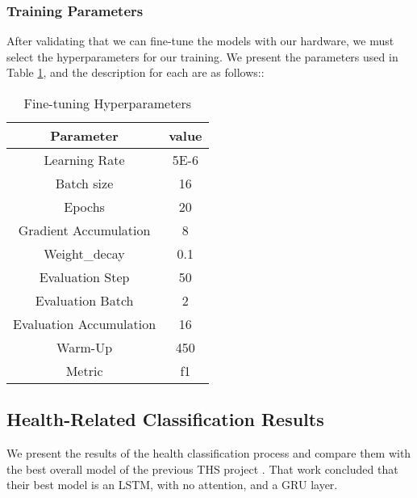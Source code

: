 \subsubsection{Training Parameters}
After validating that we can fine-tune the models with our hardware, we must select the hyperparameters for our training. We present the parameters used in Table \ref{table:hyperparameters}, and the description for each are as follows::

\begin{table}[!ht]
	\centering
	\caption{Fine-tuning Hyperparameters}
	{\small
	\begin{tabular}{||c | c||} 
		\hline
		\textbf{Parameter} & \textbf{value} \\ 
		\hline
		Learning Rate & 5E-6  \\
		\hline
		Batch size & 16  \\
		\hline
		Epochs & 20 \\
		\hline
		Gradient Accumulation & 8 \\
		\hline
		Weight\_decay & 0.1 \\
		\hline
		Evaluation Step & 50 \\
		\hline
		Evaluation Batch & 2 \\
		\hline
		Evaluation Accumulation & 16 \\
		\hline
		Warm-Up & 450 \\
		\hline
		Metric & f1 \\
		\hline
	\end{tabular}
	}
	\label{table:hyperparameters}
\end{table}



\subsection{Health-Related Classification Results}
We present the results of the health classification process and compare them with the best overall model of the previous THS project \cite{8622504}. That work concluded
that their best model is an LSTM, with no attention, and a GRU layer.

